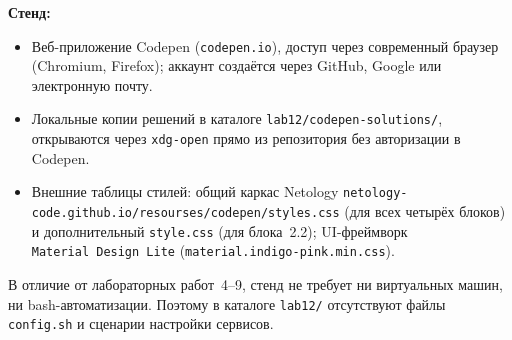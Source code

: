 \textbf{Стенд:}
\begin{itemize}
  \item Веб-приложение Codepen (\texttt{codepen.io}), доступ через
        современный браузер (Chromium, Firefox); аккаунт создаётся
        через GitHub, Google или электронную почту.
  \item Локальные копии решений в каталоге \texttt{lab12/codepen-solutions/},
        открываются через \texttt{xdg-open} прямо из репозитория без
        авторизации в Codepen.
  \item Внешние таблицы стилей: общий каркас Netology
        \texttt{netology-code.github.io/resourses/codepen/styles.css}
        (для всех четырёх блоков) и дополнительный
        \texttt{style.css} (для блока~2.2); UI-фреймворк
        \texttt{Material~Design~Lite} (\texttt{material.indigo-pink.min.css}).
\end{itemize}

В отличие от лабораторных работ~4--9, стенд не требует ни виртуальных
машин, ни bash-автоматизации. Поэтому в каталоге \texttt{lab12/}
отсутствуют файлы \texttt{config.sh} и сценарии настройки сервисов.

\endinput
